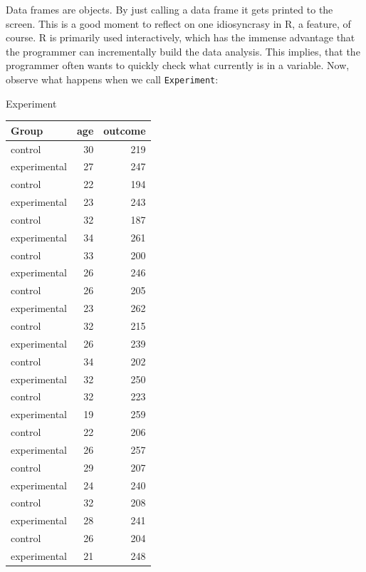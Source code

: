 \documentclass[]{svmono}
\newenvironment{Shaded}{\begin{snugshade}}{\end{snugshade}}
\newcommand{\NormalTok}[1]{#1}
\begin{document}
Data frames are objects. By just calling a data frame it gets printed to
the screen. This is a good moment to reflect on one idiosyncrasy in R, a
feature, of course. R is primarily used interactively, which has the
immense advantage that the programmer can incrementally build the data
analysis. This implies, that the programmer often wants to quickly check
what currently is in a variable. Now, observe what happens when we call
\texttt{Experiment}:

\begin{Shaded}
\begin{Highlighting}[]
\NormalTok{Experiment}
\end{Highlighting}
\end{Shaded}

\begin{tabular}{l|r|r}
\hline
Group & age & outcome\\
\hline
control & 30 & 219\\
\hline
experimental & 27 & 247\\
\hline
control & 22 & 194\\
\hline
experimental & 23 & 243\\
\hline
control & 32 & 187\\
\hline
experimental & 34 & 261\\
\hline
control & 33 & 200\\
\hline
experimental & 26 & 246\\
\hline
control & 26 & 205\\
\hline
experimental & 23 & 262\\
\hline
control & 32 & 215\\
\hline
experimental & 26 & 239\\
\hline
control & 34 & 202\\
\hline
experimental & 32 & 250\\
\hline
control & 32 & 223\\
\hline
experimental & 19 & 259\\
\hline
control & 22 & 206\\
\hline
experimental & 26 & 257\\
\hline
control & 29 & 207\\
\hline
experimental & 24 & 240\\
\hline
control & 32 & 208\\
\hline
experimental & 28 & 241\\
\hline
control & 26 & 204\\
\hline
experimental & 21 & 248\\

\end{tabular}
\end{document}
